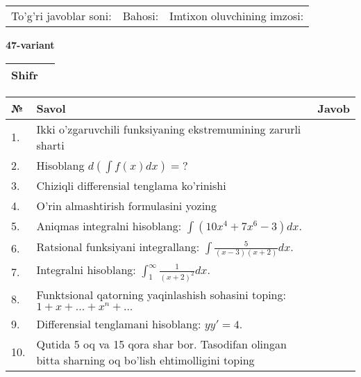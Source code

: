 \documentclass{article}
\begin{document}
  \vspace{1cm}
  
  \begin{tabular}{lll}
  To'g'ri javoblar soni: \underline{\hspace{1.5cm}} & 
  Bahosi: \underline{\hspace{1.5cm}} & 
  Imtixon oluvchining imzosi: \underline{\hspace{2cm}} \\
  \end{tabular}
  
  \egroup
  
  \newpage
  
  
  \textbf{47-variant}\\
  
  \bgroup
  \def\arraystretch{1.6} %
  
  \begin{tabular}{|m{5.7cm}|m{9.5cm}|}
  \hline
  Shifr & \\
  \hline
  \end{tabular}
  
  \vspace{1cm}
  
  \begin{tabular}{|m{0.7cm}|m{10cm}|m{4cm}|}
  \hline
  № & Savol & Javob \\
  \hline
  1. & Ikki o'zgaruvchili funksiyaning ekstremumining zarurli sharti &  \\
  \hline
  2. & Hisoblang \(d\left( \int {f(x)dx} \right) = ?\) &  \\
  \hline
  3. & Chiziqli differensial tenglama ko'rinishi &  \\
  \hline
  4. & O'rin almashtirish formulasini yozing &  \\
  \hline
  5. & Aniqmas integralni hisoblang: \(\int {\left( 10x^{4} + 7x^{6} - 3 \right)dx}\). &  \\
  \hline
  6. & Ratsional funksiyani integrallang: \(\int {\frac{5}{(x - 3)(x + 2)}dx}\). &  \\
  \hline
  7. & Integralni hisoblang: \(\int_{1}^{\infty}{\frac{1}{(x + 2)^{2}}dx}\). &  \\
  \hline
  8. & Funktsional qatorning yaqinlashish sohasini toping:\(1 + x + ... + x^{n} + ...\) &  \\
  \hline
  9. & Differensial tenglamani hisoblang: \(yy' = 4\). &  \\
  \hline
  10. & Qutida 5 oq va 15 qora shar bor. Tasodifan olingan bitta sharning oq bo'lish ehtimolligini toping &  \\
  \hline
  \end{tabular}
  
\end{document}

